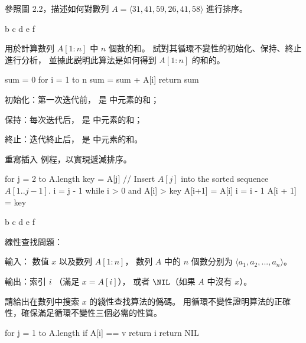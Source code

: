 \startsection[
  title={Insertion sort},,
  reference=section:insersion_sort,
]

\startEXERCISE
參照圖 2.2，描述如何對數列 $A = \langle 31, 41, 59, 26, 41, 58\rangle$ 進行排序。
\stopEXERCISE

\startANSWER
{}
{\externalfigure[output/e2_1_1-2]}{b}
{\externalfigure[output/e2_1_1-3]}{c}
{\externalfigure[output/e2_1_1-4]}{d}
{\externalfigure[output/e2_1_1-5]}{e}
{\externalfigure[output/e2_1_1-6]}{f}
\stopcombination
\stopANSWER

\startEXERCISE
{} 用於計算數列 $A[1:n]$ 中 $n$ 個數的和。
試對其循環不變性的初始化、保持、終止進行分析，
並據此説明此算法是如何得到 $A[1:n]$ 的和的。

\startCLRSCODE
sum = 0
for i = 1 to n
	sum = sum + A[i]
return sum
\stopCLRSCODE
\stopEXERCISE

\startANSWER
\startigBase
\item 初始化：第一次迭代前，  是  中元素的和；
\item 保持：每次迭代后，  是  中元素的和；
\item 終止：迭代終止后，  是  中元素的和。
\stopigBase
\stopANSWER

\startEXERCISE
重寫插入 例程，以實現遞減排序。
\stopEXERCISE
\startANSWER

\startCLRSCODE
for j = 2 to A.length
	key = A[j]
	// Insert $A[j]$ into the sorted sequence $A[1 .. j-1]$.
	i = j - 1
	while i > 0 and A[i] > key
		A[i+1] = A[i]
		i = i - 1
	A[i + 1] = key
\stopCLRSCODE

{\externalfigure[output/e2_1_2-2]}{b}
{\externalfigure[output/e2_1_2-3]}{c}
{\externalfigure[output/e2_1_2-4]}{d}
{\externalfigure[output/e2_1_2-5]}{e}
{\externalfigure[output/e2_1_2-6]}{f}
\stopcombination
\stopANSWER

線性查找問題：

輸入： 数值 $x$ 以及数列 $A[1:n]$，
数列 $A$ 中的 $n$ 個數分别为 $\langle a_1, a_2, ..., a_n \rangle$。

輸出：索引 $i$ （滿足 $x = A[i]$），
或者 $\NIL$（如果 $A$ 中沒有 $x$）。

請給出在數列中搜索 $x$ 的綫性查找算法的僞碼。
用循環不變性證明算法的正確性，確保滿足循環不變性三個必需的性質。
\stopEXERCISE

\startANSWER
\startCLRSCODE
for j = 1 to A.length
	if A[i] == v
		return i
return NIL
\stopCLRSCODE
\stopANSWER

